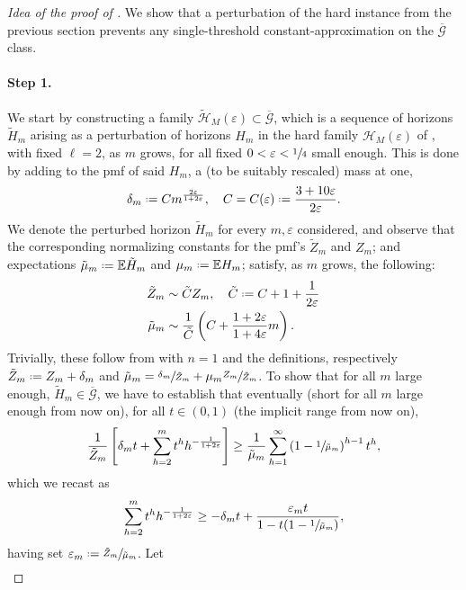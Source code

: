 \documentclass[11pt, a4paper, twoside]{article}
\newcommand*{\defeq}{\mathrel{\vcenter{\baselineskip0.5ex \lineskiplimit0pt
			\hbox{\scriptsize.}\hbox{\scriptsize.}}}=}
\newcommand{\eps}{\varepsilon}
\newcommand{\EE}{\mathbb{E}}
\newcommand{\PGFd}{\overline{\mathcal{G}}}
\numberwithin{equation}{section}
\begin{document}
	\begin{proof}[Idea of the proof of ]
		We show that a perturbation of the hard instance from the previous section prevents any single-threshold constant-approximation on the $\PGFd$ class.
		\paragraph{Step 1.} We start by constructing a family $\tilde{\mathcal{H}}_M(\eps)\subset\PGFd$, which is a sequence of horizons $\tilde{H}_m$ arising as a perturbation of horizons $H_m$ in the hard family $\mathcal{H}_M(\eps)$ of , with fixed $\ell=2$, as $m$ grows, for all fixed $0<\eps<\sfrac{1}{4}$ small enough. This is done by adding to the pmf of said $H_m$, a (to be suitably rescaled) mass at one, 
		\begin{equation*}
			\delta_m\defeq Cm^{\frac{2\eps}{1+2\eps}},\quad C=C(\eps)\defeq\frac{3+10\eps}{2\eps}.
		\end{equation*} 
		We denote the perturbed horizon $\tilde{H}_m$ for every $m,\eps$ considered, and observe that the corresponding normalizing constants for the pmf's $\tilde{Z}_m$ and $Z_m$; and expectations $\tilde{\mu}_m\defeq\EE\tilde{H}_m$ and $\mu_m\defeq\EE H_m$; satisfy, as $m$ grows, the following:
		\begin{align*}
			\tilde{Z}_m&\sim \tilde{C}Z_m,\quad \tilde{C}\defeq C+1+\frac{1}{2\eps}\\ 
			\tilde{\mu}_m&\sim\frac{1}{\tilde{C}}\left(C+\frac{1+2\eps}{1+4\eps}m\right).
		\end{align*} 
		Trivially, these follow from  with $n=1$ and the definitions, respectively $\tilde{Z}_m\defeq Z_m+\delta_m$ and $\tilde{\mu}_m = \sfrac{\delta_m}{\tilde{Z}_m}+\mu_m\sfrac{Z_m}{\tilde{Z}_m}$.
		To show that for all $m$ large enough, $\tilde{H}_m\in\PGFd$, we have to establish that eventually (short for all $m$ large enough from now on), for all $t\in(0,1)$ (the implicit range from now on),
		\[\frac{1}{\tilde{Z}_m}\left[\delta_mt+\sum_{h=2}^m t^h h^{-\frac{1}{1+2\eps}}\right]\ge\frac{1}{\tilde{\mu}_m}\sum_{h=1}^\infty\left(1-\sfrac{1}{\tilde{\mu}_m}\right)^{h-1}t^h,\]
		which we recast as
		\begin{equation}\label{targetmain}
			\sum_{h=2}^m t^h h^{-\frac{1}{1+2\eps}}\ge -\delta_mt+\frac{\eps_mt}{1-t(1-\sfrac{1}{\tilde{\mu}_m})},
		\end{equation}
		having set $\eps_m\defeq \sfrac{\tilde{Z}_m}{\tilde{\mu}_m}$. Let 
		\begin{align*}

\end{align*}
\end{proof}
\end{document}
